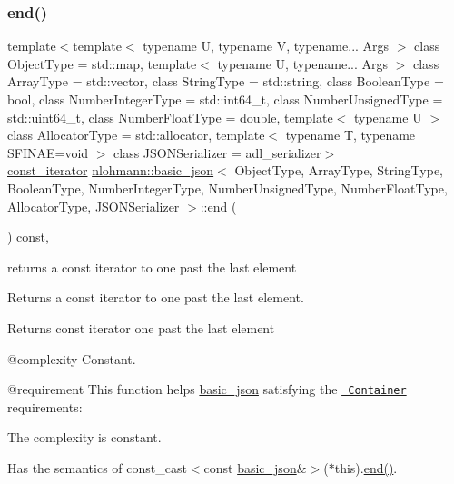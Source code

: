 \subsubsection{\texorpdfstring{end()}{end()}\hspace{0.1cm}{\footnotesize\ttfamily [2/2]}}
{\footnotesize\ttfamily template$<$template$<$ typename U, typename V, typename... Args $>$ class Object\+Type = std\+::map, template$<$ typename U, typename... Args $>$ class Array\+Type = std\+::vector, class String\+Type  = std\+::string, class Boolean\+Type  = bool, class Number\+Integer\+Type  = std\+::int64\+\_\+t, class Number\+Unsigned\+Type  = std\+::uint64\+\_\+t, class Number\+Float\+Type  = double, template$<$ typename U $>$ class Allocator\+Type = std\+::allocator, template$<$ typename T, typename S\+F\+I\+N\+A\+E=void $>$ class J\+S\+O\+N\+Serializer = adl\+\_\+serializer$>$ \\
\mbox{\hyperlink{classnlohmann_1_1basic__json_a41a70cf9993951836d129bb1c2b3126a}{const\+\_\+iterator}} \mbox{\hyperlink{classnlohmann_1_1basic__json}{nlohmann\+::basic\+\_\+json}}$<$ Object\+Type, Array\+Type, String\+Type, Boolean\+Type, Number\+Integer\+Type, Number\+Unsigned\+Type, Number\+Float\+Type, Allocator\+Type, J\+S\+O\+N\+Serializer $>$\+::end (\begin{DoxyParamCaption}{ }\end{DoxyParamCaption}) const\hspace{0.3cm}{\ttfamily [inline]}, {\ttfamily [noexcept]}}



returns a const iterator to one past the last element 

Returns a const iterator to one past the last element.

 \begin{DoxyReturn}{Returns}
const iterator one past the last element
\end{DoxyReturn}
@complexity Constant.

@requirement This function helps {\ttfamily \mbox{\hyperlink{classnlohmann_1_1basic__json}{basic\+\_\+json}}} satisfying the \href{http://en.cppreference.com/w/cpp/concept/Container}{\texttt{ Container}} requirements\+:
\begin{DoxyItemize}
\item The complexity is constant.
\item Has the semantics of {\ttfamily const\+\_\+cast$<$const \mbox{\hyperlink{classnlohmann_1_1basic__json}{basic\+\_\+json}}\&$>$($\ast$this).\mbox{\hyperlink{classnlohmann_1_1basic__json_a13e032a02a7fd8a93fdddc2fcbc4763c}{end()}}}.
\end{DoxyItemize}

